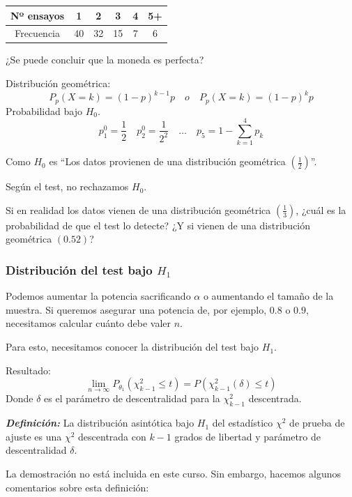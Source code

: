 \begin{table}[!h]
    \centering
    \begin{tabular}{|c|c|c|c|c|c|}
        \hline
        {Nº ensayos} & 1 & 2 & 3 & 4 & 5+ \\ \hline
        {Frecuencia} & 40 & 32 & 15 & 7 & 6 \\ \hline
    \end{tabular}
\end{table}

¿Se puede concluir que la moneda es perfecta?

Distribución geométrica:
\[
    P_p(X=k)=(1-p)^{k-1}p \quad o \quad P_p(X=k)=(1-p)^{k}p
\]
Probabilidad bajo $H_0$.
\[
    p_1^0=\frac{1}{2} \quad p_2^0=\frac{1}{2^2} \quad \dots \quad p_5=1-\sum_{k=1}^{4} p_k
\]

Como $H_0$ es ``Los datos provienen de una distribución geométrica $\left(\frac{1}{2}\right)$''.

Según el test, no rechazamos $H_0$.

Si en realidad los datos vienen de una distribución geométrica $\left(\frac{1}{3}\right)$,  
¿cuál es la probabilidad de que el test lo detecte?  
¿Y si vienen de una distribución geométrica $(0.52)$?

\subsubsection{Distribución del test bajo $H_1$}

Podemos aumentar la potencia sacrificando $\alpha$ o aumentando el tamaño de la muestra.  
Si queremos asegurar una potencia de, por ejemplo, $0.8$ o $0.9$, necesitamos calcular cuánto debe valer $n$.

Para esto, necesitamos conocer la distribución del test bajo $H_1$.

Resultado:
\[
\lim_{n \to \infty} P_{\theta_1} (\chi^2_{k-1} \leq t) = P(\chi^2_{k-1}(\delta) \leq t)
\]
Donde $\delta$ es el parámetro de descentralidad para la $\chi^2_{k-1}$ descentrada.

\textit{\textbf{Definición:}} La distribución asintótica bajo $H_1$ del estadístico $\chi^2$ de prueba de ajuste es una $\chi^2$ descentrada con $k-1$ grados de libertad y parámetro de descentralidad $\delta$.

La demostración no está incluida en este curso. Sin embargo, hacemos algunos comentarios sobre esta definición:

